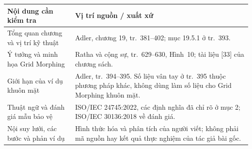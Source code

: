 \documentclass[11pt,a4paper]{article}
\begin{document}
\begin{tabularx}{\linewidth}{@{}p{.36\linewidth}Y@{}}
\toprule
Nội dung cần kiểm tra & Vị trí nguồn / xuất xứ \\
\midrule
Tổng quan chương và vị trí kỹ thuật & Adler, chương 19, tr.~381--402; mục 19.5.1 ở tr.~393. \\
Ý tưởng và minh họa Grid Morphing & Ratha và cộng sự, tr.~629--630, Hình~10; tài liệu [33] của chương sách. \\
Giới hạn của ví dụ khuôn mặt & Adler, tr.~394--395. Số liệu vân tay ở tr.~395 thuộc phương pháp khác, không dùng làm số liệu cho Grid Morphing khuôn mặt. \\
Thuật ngữ và đánh giá mẫu bảo vệ & ISO/IEC 24745:2022, các định nghĩa đã chỉ rõ ở mục 2; ISO/IEC 30136:2018 về đánh giá. \\
Nội suy lưới, các bước và phản ví dụ & Hình thức hóa và phân tích của người viết; không phải mã nguồn hay kết quả thực nghiệm của tác giả bài gốc. \\
\bottomrule
\end{tabularx}
\end{document}
